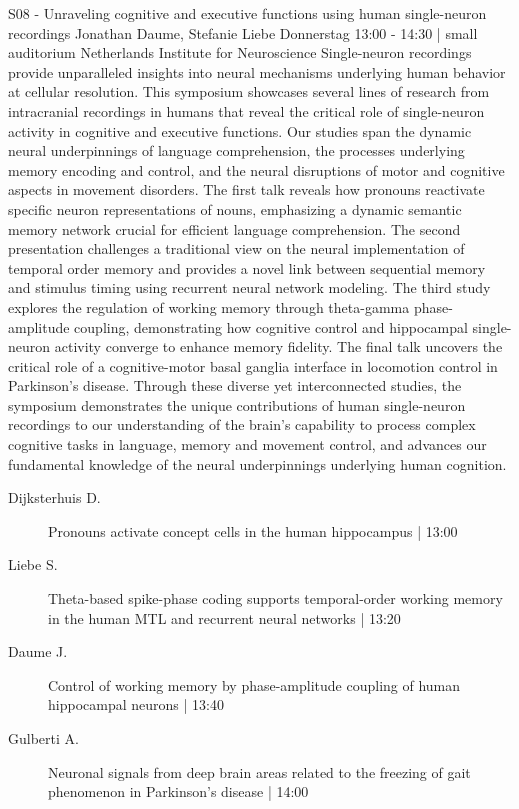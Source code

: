 
            \begin{symposium}
            {S08 - Unraveling cognitive and executive functions using human single-neuron recordings}
            {Jonathan Daume, Stefanie Liebe}
            {Donnerstag 13:00 - 14:30 | small auditorium}
            {Netherlands Institute for Neuroscience}
            Single-neuron recordings provide unparalleled insights into neural mechanisms underlying human behavior at cellular resolution. This symposium showcases several lines of research from intracranial recordings in humans that reveal the critical role of single-neuron activity in cognitive and executive functions. Our studies span the dynamic neural underpinnings of language comprehension, the processes underlying memory encoding and control, and the neural disruptions of motor and cognitive aspects in movement disorders. The first talk reveals how pronouns reactivate specific neuron representations of nouns, emphasizing a dynamic semantic memory network crucial for efficient language comprehension. The second presentation challenges a traditional view on the neural implementation of temporal order memory and provides a novel link between sequential memory and stimulus timing using recurrent neural network modeling. The third study explores the regulation of working memory through theta-gamma phase-amplitude coupling, demonstrating how cognitive control and hippocampal single-neuron activity converge to enhance memory fidelity. The final talk uncovers the critical role of a cognitive-motor basal ganglia interface in locomotion control in Parkinson's disease. Through these diverse yet interconnected studies, the symposium demonstrates the unique contributions of human single-neuron recordings to our understanding of the brain's capability to process complex cognitive tasks in language, memory and movement control, and advances our fundamental knowledge of the neural underpinnings underlying human cognition.
            \begin{description}    
            
                \item [ Dijksterhuis D.] Pronouns activate concept cells in the human hippocampus \textcolor{mygray}{ | 13:00}    
                
                \item [ Liebe S.] Theta-based spike-phase coding supports temporal-order working memory in the human MTL and recurrent neural networks \textcolor{mygray}{ | 13:20}    
                
                \item [ Daume J.] Control of working memory by phase-amplitude coupling of human hippocampal neurons  \textcolor{mygray}{ | 13:40}    
                
                \item [ Gulberti A.] Neuronal signals from deep brain areas related to the freezing of gait phenomenon in Parkinson’s disease \textcolor{mygray}{ | 14:00}    
                
            \end{description} 
            \end{symposium}
            
